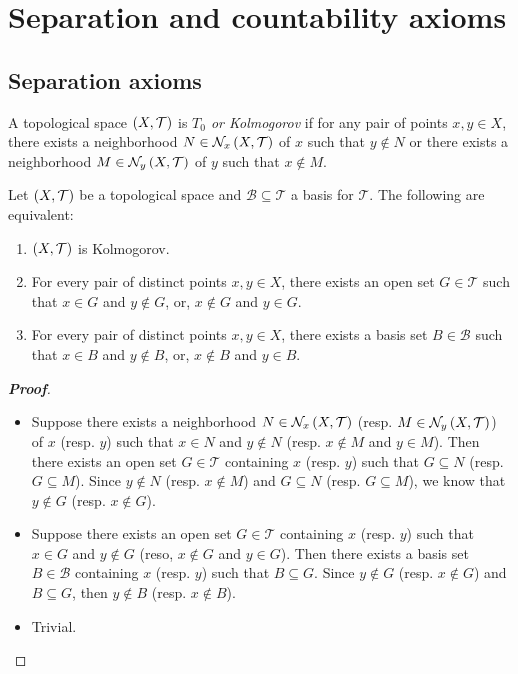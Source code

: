 \chapter{Separation and countability axioms}

\section{Separation axioms}

\begin{definition}
  A topological space $\left(X,\mathcal{T}\right)$ is \textit{$T_0$ or Kolmogorov} if for any pair of points $x,y\in X$, there exists a neighborhood $N\in\mathcal{N}_x\left(X,\mathcal{T}\right)$ of $x$ such that $y\notin N$ or there exists a neighborhood $M\in\mathcal{N}_y\left(X,\mathcal{T}\right)$ of $y$ such that $x\notin M$.
\end{definition}

\begin{proposition}
  Let $\left(X,\mathcal{T}\right)$ be a topological space and $\mathcal{B}\subseteq\mathcal{T}$ a basis for $\mathcal{T}$. The following are equivalent:

  \begin{enumerate}
    \item $\left(X,\mathcal{T}\right)$ is Kolmogorov.
    \item For every pair of distinct points $x,y\in X$, there exists an open set $G\in\mathcal{T}$ such that $x\in G$ and $y\notin G$, or, $x\notin G$ and $y\in G$.
    \item For every pair of distinct points $x,y\in X$, there exists a basis set $B\in\mathcal{B}$ such that $x\in B$ and $y\notin B$, or, $x\notin B$ and $y\in B$.
  \end{enumerate}

  \begin{proof}[\rm\textbf{Proof}]
    \hfill
    \begin{itemize}
      \item[\boxed{1\Rightarrow2}] Suppose there exists a neighborhood $N\in\mathcal{N}_x\left(X,\mathcal{T}\right)$ (resp. $M\in\mathcal{N}_y\left(X,\mathcal{T}\right)$) of $x$ (resp. $y$) such that $x\in N$ and $y\notin N$ (resp. $x\notin M$ and $y\in M$). Then there exists an open set $G\in\mathcal{T}$ containing $x$ (resp. $y$) such that $G\subseteq N$ (resp. $G\subseteq M$). Since $y\notin N$ (resp. $x\notin M$) and $G\subseteq N$ (resp. $G\subseteq M$), we know that $y\notin G$ (resp. $x\notin G$).
      \item[\boxed{2\Rightarrow3}] Suppose there exists an open set $G\in\mathcal{T}$ containing $x$ (resp. $y$) such that $x\in G$ and $y\notin G$ (reso, $x\notin G$ and $y\in G$). Then there exists a basis set $B\in\mathcal{B}$ containing $x$ (resp. $y$) such that $B\subseteq G$. Since $y\notin G$ (resp. $x\notin G$) and $B\subseteq G$, then $y\notin B$ (resp. $x\notin B$).
      \item[\boxed{3\Rightarrow1}] Trivial.
    \end{itemize}
  \end{proof}
\end{proposition}

